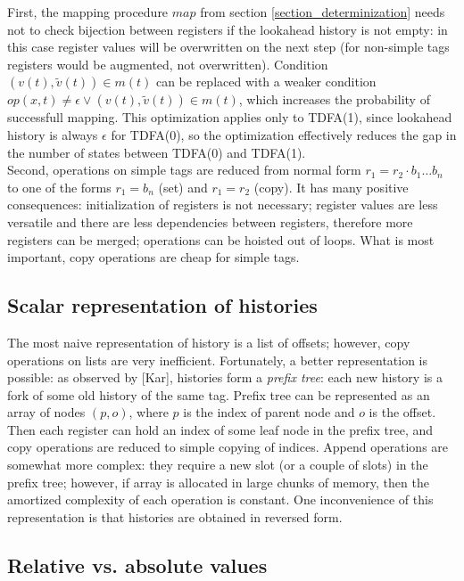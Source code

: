 \documentclass{article}
\newcommand{\Xin}{\!\in\!}
\newcommand{\Xeq}{\!=\!}
\theoremstyle{definition}
\begin{document}
\begin{multicols}{2}
First, the mapping procedure $map$ from section \ref{section_determinization}
needs not to check bijection between registers if the lookahead history is not empty:
in this case register values will be overwritten on the next step
(for non-simple tags registers would be augmented, not overwritten).
Condition $(v(t), \widetilde{v}(t)) \Xin m(t)$
can be replaced with a weaker condition $op(x, t) \!\neq\! \epsilon \vee (v(t), \widetilde{v}(t)) \Xin m(t)$,
which increases the probability of successfull mapping.
This optimization applies only to TDFA(1), since lookahead history is always $\epsilon$ for TDFA(0),
so the optimization effectively reduces the gap in the number of states between TDFA(0) and TDFA(1).
\\

Second, operations on simple tags are reduced from normal form $r_1 \Xeq r_2 \cdot b_1 \dots b_n$
to one of the forms $r_1 \Xeq b_n$ (set) and $r_1 \Xeq r_2$ (copy).
It has many positive consequences:
initialization of registers is not necessary;
register values are less versatile and there are less dependencies between registers, therefore more registers can be merged;
operations can be hoisted out of loops.
What is most important, copy operations are cheap for simple tags.

\subsection*{Scalar representation of histories}

The most naive representation of history is a list of offsets;
however, copy operations on lists are very inefficient.
Fortunately, a better representation is possible: as observed by [Kar], histories form a \emph{prefix tree}:
each new history is a fork of some old history of the same tag.
Prefix tree can be represented as an array of nodes $(p, o)$,
where $p$ is the index of parent node and $o$ is the offset.
Then each register can hold an index of some leaf node in the prefix tree,
and copy operations are reduced to simple copying of indices.
Append operations are somewhat more complex: they require a new slot (or a couple of slots) in the prefix tree;
however, if array is allocated in large chunks of memory,
then the amortized complexity of each operation is constant.
One inconvenience of this representation is that histories are obtained in reversed form.

\subsection*{Relative vs. absolute values}


\end{multicols}
\end{document}

